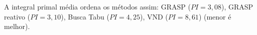 A integral primal média ordena os métodos assim: GRASP ($\mathit{PI}=3{,}08$), GRASP reativo ($\mathit{PI}=3{,}10$), Busca Tabu ($\mathit{PI}=4{,}25$), VND ($\mathit{PI}=8{,}61$) (menor é melhor).
